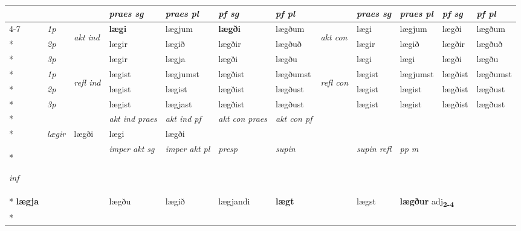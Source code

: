 \begin{longtable}[l]{X>{\footnotesize\itshape}llXXXXlXXXX}
 & &   & \textit{praes sg}  & \textit{praes pl}    & \textit{ pf sg} & \textit{pf pl} & & \textit{praes sg}  & \textit{praes pl}    & \textit{pf sg} & \textit{pf pl }  \\ \cmidrule{4-7} \cmidrule{9-12}
 \multirow{2}{*}{{{\textbf{v{\textsubscript{2}}} \Large{\textbf{90}}}}}  & 1p & \multirow{3}{*}{\begin{turn}{90}\textit{akt ind}\end{turn}} & \textbf{lægi} & lægjum & \textbf{lægði} & lægðum & \multirow{3}{*}{\begin{turn}{90}\textit{akt con}\end{turn}} &lægi & lægjum & lægði & lægðum\\*
 & 2p &  &  lægir  & lægið & lægðir & lægðuð & & lægir & lægið & lægðir & lægðuð \\*
 & 3p &  & lægir & lægja & lægði & lægðu & & lægi & lægi& lægði & lægðu \\*
\cmidrule{4-7} \cmidrule{9-12}
 & 1p & \multirow{3}{*}{\begin{turn}{90}\textit{refl ind}\end{turn}}  & lægist & lægjumst & lægðist & lægðumst & \multirow{3}{*}{\begin{turn}{90}\textit{refl con}\end{turn}}  &lægist & lægjumst & lægðist & lægðumst \\*
 & 2p &  & lægist & lægist & lægðist & lægðust & &lægist & lægist & lægðist & lægðust \\*
 & 3p  & & lægist & lægjast & lægðist & lægðust & & lægist & lægist& lægðist & lægðust \\*
\cmidrule{4-7} \cmidrule{9-12}

   && &  \textit{akt ind praes} & \textit{akt ind pf} & \textit{akt con praes} & \textit{akt con pf} \\*
\multicolumn{3}{r}{\textit{e-n}} & lægir & lægði & lægi & lægði \\*

\cmidrule{4-7}
   {\textit{inf}} & &  & \textit{imper akt sg} & \textit{imper akt pl}   & \textit{presp} & \textit{supin} && \textit{supin refl} & \textit{pp m} \\*
  {\textbf{lægja}} & && lægðu  & lægið   & lægjandi &  \textbf{lægt} && lægst & \multicolumn{2}{l}{\textbf{lægður} adj\textbf{\textsubscript{2-4}}} \\*

\midrule


\end{longtable}
